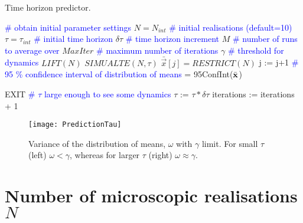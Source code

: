 \documentclass[11pt]{article}
\begin{document}
\begin{algorithm}[h]
	\caption{Time horizon predictor. \label{algorithm:tau}}
	\begin{algorithmic}
		\State \textcolor{blue}{\# obtain initial parameter settings}
		\State $N=N_{int}$ \textcolor{blue}{\# initial realisations (default=10)}
		\State $\tau=\tau_{int}$ \textcolor{blue}{\# initial time horizon}
		\State $\delta\tau$ \textcolor{blue}{\# time horizon increment}
		\State $M$ \textcolor{blue}{\# number of runs to average over}
		\State $MaxIter$ \textcolor{blue}{\# maximum number of iterations}
		\State $\gamma$ \textcolor{blue}{\# threshold for dynamics}
				\State $LIFT(N)$
				\State $SIMUALTE(N,\tau)$
				\State $\bar{\vec{x}}[j] = RESTRICT(N)$
				\State j := j+1
			\EndFor
			\State \textcolor{blue}{\# 95 \% confidence interval of distribution of means}
			 = 95ConfInt({$\bar{\bf x}$})
		
			\If {$\omega > \gamma$} 
				\State EXIT \textcolor{blue}{\# $\tau$ large enough to see some dynamics}
			\EndIf
			\State $\tau$ := $\tau * \delta\tau$
			\State iterations := iterations + 1
		\EndWhile

\end{algorithmic}
\end{algorithm}

\begin{figure}[h]
	\centering
	\texttt{[image: PredictionTau]}
	\caption{Variance of the distribution of means, $\omega$ with $\gamma$ limit. For small $\tau$ (left) $\omega<\gamma$, whereas for larger $\tau$ (right) $\omega\approx\gamma$. \label{fig:tauGamma}}
\end{figure}


\section{Number of microscopic realisations $N$}
\label{sec:parametersN}
\end{document}
